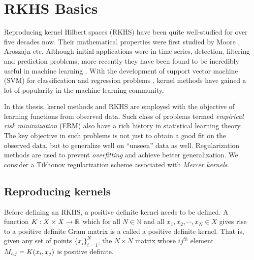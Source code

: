 \section{RKHS Basics}
\label{s:rkhs_basics}
Reproducing kernel Hilbert spaces (RKHS) have been quite well-studied for over five decades now. Their mathematical properties were first studied by Moore \cite{moo1916}, Aroszajn \cite{aro50} etc. Although initial applications were in time series, detection, filtering and prediction problems, more recently they have been found to be incredibly useful in machine learning \cite{wah90}. With the development of support vector machine (SVM) for classification and regression problems \cite{corvap95, drucburkaufsmovap97}, kernel methods have gained a lot of popularity in the machine learning community. 

In this thesis, kernel methods and RKHS are employed with the objective of learning functions from observed data. Such class of problems termed \textit{empirical risk minimization} (ERM) also have a rich history in statistical learning theory. The key objective in such problems is not just to obtain a good fit on the observed data, but to generalize well on ``unseen'' data as well. Regularization methods are used to prevent \textit{overfitting} and achieve better generalization. We consider a Tikhonov regularization scheme \cite{tikars79} associated with \textit{Mercer kernels}.

\subsection{Reproducing kernels} 
Before defining an RKHS, a positive definite kernel needs to be defined. A function $K : X \times X \to \mathbb{R}$ which for all $N \in \mathbb{N}$ and all $x_1,x_2,\cdots,x_N \in X$ gives rise to a positive definite Gram matrix is a called a positive definite kernel. That is, given any set of points $\{x_i\}_{i=1}^N$, the $N\times N $ matrix whose $ij^{th}$ element $M_{i,j} = K(x_i,x_j)$ is positive definite.  

